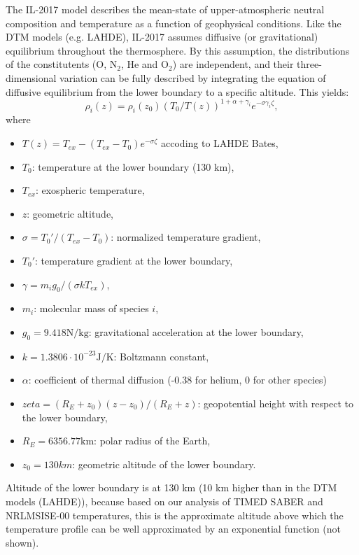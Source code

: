 \documentclass[referee,a4paper,12pt,traditabstract]{swsc}
\begin{document}
\begin{linenumbers}
The IL-2017 model describes the mean-state of upper-atmospheric neutral composition and temperature as a function of geophysical conditions. Like the DTM models (e.g. LAHDE), IL-2017 assumes diffusive (or gravitational) equilibrium throughout the thermosphere. By this assumption, the distributions of the constitutents (O, $\mathrm{N_{2}}$, He and $\mathrm{O_{2}}$) are independent, and their three-dimensional variation can be fully described by integrating the equation of diffusive equilibrium from the lower boundary to a specific altitude. This yields:
\begin{equation}
\rho_i(z) = \rho_i(z_0) (T_0 / T(z))^{1+\alpha+\gamma_i}e^{-\sigma \gamma_i \zeta},
\end{equation}
where 
\begin{itemize}
\item $T(z) = T_{ex} - (T_{ex} - T_0) e^{-\sigma \zeta}$ accoding to LAHDE Bates,
\item $T_0$: temperature at the lower boundary (130 km),
\item $T_{ex}$: exospheric temperature,
\item $z$: geometric altitude,
\item $\sigma = T_0'/(T_{ex} - T_0)$: normalized temperature gradient,
\item $T_0'$: temperature gradient at the lower boundary,
\item $\gamma = m_i g_0 / (\sigma k T_{ex})$,
\item $m_i$: molecular mass of species $i$,
\item $g_0 = 9.418 \mathrm{N/kg}$: gravitational acceleration at the lower boundary,
\item $k = 1.3806 \cdot 10^{-23} \mathrm{J/K}$: Boltzmann constant,
\item $\alpha$: coefficient of thermal diffusion (-0.38 for helium, 0 for other species)
\item $zeta = (R_E + z_0)(z - z_0)/(R_E + z)$: geopotential height with respect to the lower boundary,
\item $R_E = 6356.77 \mathrm{km}$: polar radius of the Earth,
\item $z_0 = 130 km$: geometric altitude of the lower boundary.
\end{itemize}
Altitude of the lower boundary is at 130 km (10 km higher than in the DTM models (LAHDE)), because based on our analysis of TIMED SABER and NRLMSISE-00 temperatures, this is the approximate altitude above which the temperature profile can be well approximated by an exponential function (not shown).


\end{linenumbers}
\end{document}
